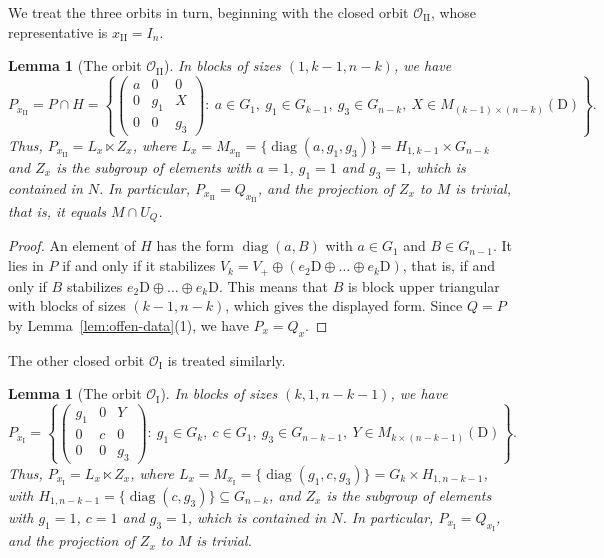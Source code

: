 \documentclass[11pt]{amsart}
\numberwithin{equation}{section}
\theoremstyle{plain}
\newtheorem{lemma}[theorem]{Lemma}
\theoremstyle{definition}
\theoremstyle{remark}
\DeclareMathOperator{\diag}{diag}
\newcommand{\OI}{\mathcal{O}_{\mathrm{I}}}
\newcommand{\OII}{\mathcal{O}_{\mathrm{II}}}
\begin{document}
We treat the three orbits in turn, beginning with the closed orbit $\OII$, whose representative is $x_{\mathrm{II}}=I_n$.

\begin{lemma}[The orbit $\OII$]\label{lem:stab-II}
	In blocks of sizes $(1,k-1,n-k)$, we have
	$$
	P_{x_{\mathrm{II}}}=P\cap H=\left\{\begin{pmatrix}a&0&0\\0&g_1&X\\0&0&g_3\end{pmatrix}:\ a\in G_1,\ g_1\in G_{k-1},\ g_3\in G_{n-k},\ X\in M_{(k-1)\times(n-k)}(\mathrm{D})\right\}.
	$$
	Thus, $P_{x_{\mathrm{II}}}=L_x\ltimes Z_x$, where $L_x=M_{x_{\mathrm{II}}}=\{\diag(a,g_1,g_3)\}=H_{1,k-1}\times G_{n-k}$ and $Z_x$ is the subgroup of elements with $a=1$, $g_1=1$ and $g_3=1$, which is contained in $N$. In particular, $P_{x_{\mathrm{II}}}=Q_{x_{\mathrm{II}}}$, and the projection of $Z_x$ to $M$ is trivial, that is, it equals $M\cap U_Q$.
\end{lemma}

\begin{proof}
	An element of $H$ has the form $\diag(a,B)$ with $a\in G_1$ and $B\in G_{n-1}$. It lies in $P$ if and only if it stabilizes $V_k=V_+\oplus(e_2\mathrm{D}\oplus\dots\oplus e_k\mathrm{D})$, that is, if and only if $B$ stabilizes $e_2\mathrm{D}\oplus\dots\oplus e_k\mathrm{D}$. This means that $B$ is block upper triangular with blocks of sizes $(k-1,n-k)$, which gives the displayed form. Since $Q=P$ by Lemma~\ref{lem:offen-data}(1), we have $P_x=Q_x$.
\end{proof}

The other closed orbit $\OI$ is treated similarly.

\begin{lemma}[The orbit $\OI$]\label{lem:stab-I}
	In blocks of sizes $(k,1,n-k-1)$, we have
	$$
	P_{x_{\mathrm I}}=\left\{\begin{pmatrix}g_1&0&Y\\0&c&0\\0&0&g_3\end{pmatrix}:\ g_1\in G_k,\ c\in G_1,\ g_3\in G_{n-k-1},\ Y\in M_{k\times(n-k-1)}(\mathrm{D})\right\}.
	$$
	Thus, $P_{x_{\mathrm I}}=L_x\ltimes Z_x$, where $L_x=M_{x_{\mathrm I}}=\{\diag(g_1,c,g_3)\}=G_k\times H_{1,n-k-1}$, with $H_{1,n-k-1}=\{\diag(c,g_3)\}\subseteq G_{n-k}$, and $Z_x$ is the subgroup of elements with $g_1=1$, $c=1$ and $g_3=1$, which is contained in $N$. In particular, $P_{x_{\mathrm I}}=Q_{x_{\mathrm I}}$, and the projection of $Z_x$ to $M$ is trivial.
\end{lemma}
\end{document}
